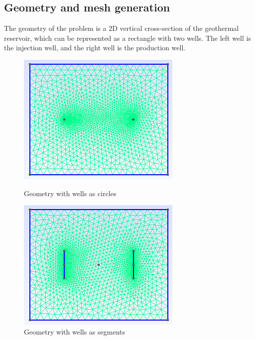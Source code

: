 \documentclass[a4paper,12pt]{report}
\begin{document}
\subsection{Geometry and mesh generation}
The geometry of the problem is a 2D vertical cross-section of the geothermal 
reservoir, which can be represented as a rectangle with two wells. The left well is 
the injection well, and the right well is the production well. 
\begin{figure}[h!]
    \centering
    \begin{minipage}[t]{0.48\textwidth}
        \centering
        \includegraphics[width=\textwidth]{Image/trous.png}
        \caption{Geometry with wells as circles}
        \label{fig:geo_segments}
    \end{minipage}
    \hfill
    \begin{minipage}[t]{0.48\textwidth}
        \centering
        \includegraphics[width=\textwidth]{Image/Line.png}
        \caption{Geometry with wells as segments}
        \label{fig:geo_ronds}
    \end{minipage}
\end{figure}
\end{document}
